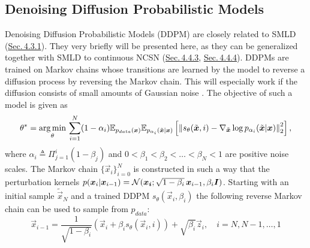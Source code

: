 \subsection{Denoising Diffusion Probabilistic Models} \label{sec:4.4.2}
Denoising Diffusion Probabilistic Models (DDPM) \cite{ho2020denoising} are closely related to SMLD (\hyperref[sec:4.3.1]{Sec.\,4.3.1}). They very briefly will be presented here, as they can be generalized together with SMLD to continuous NCSN (\hyperref[sec:4.4.3]{Sec.\,4.4.3}, \hyperref[sec:4.4.4]{Sec.\,4.4.4}). DDPMs are trained on Markov chains whose transitions are learned by the model to reverse a diffusion process by reversing the Markov chain. This will especially work if the diffusion consists of small amounts of Gaussian noise \cite{ho2020denoising}. The objective of such a model is given as 
%
\begin{equation} \label{equ:4.12} 
    \theta^*=\underset{\theta}{\arg\min}\,\sum_{i=1}^N(1-\alpha_i)\mathbb{E}_{p_{data}(\boldsymbol{x})}\mathbb{E}_{p_{\alpha_i}(\tilde{\boldsymbol{x}}|\boldsymbol{x})}\left[\left\lVert s_\theta(\tilde{\boldsymbol{x}},i)-\nabla_{\tilde{\boldsymbol{x}}}\log p_{\alpha_i}(\tilde{\boldsymbol{x}}|\boldsymbol{x})\right\rVert_2^2\right],
\end{equation}
%
where $\alpha_i\triangleq\Pi_{j=1}^i(1-\beta_j)$ and $0<\beta_1<\beta_2<\dots<\beta_N<1$ are positive noise scales. The Markov chain $\{\vec{x}_i\}_{i=0}^N$ is constructed in such a way that the perturbation kernels $p(\vec{x}_i|\vec{x}_{i-1})=\nolinebreak\mathcal{N}(\vec{x_i};\sqrt{1-\beta_i}\,\vec{x}_{i-1},\beta_i\vec{I})$. Starting with an initial sample $\tilde{\vec{x}}_N$ and a trained DDPM $s_\theta(\vec{x}_i, \beta_i)$ the following reverse Markov chain can be used to sample from $p_{data}$:
%
\begin{equation} \label{equ:4.13}
    \vec{x}_{i-1}=\frac{1}{\sqrt{1-\beta_i}}(\vec{x}_i+\beta_is_\theta(\vec{x}_i,i))+\sqrt{\beta_i}\vec{z}_i,\quad i=N,N-1,\dots,1
\end{equation}
%
